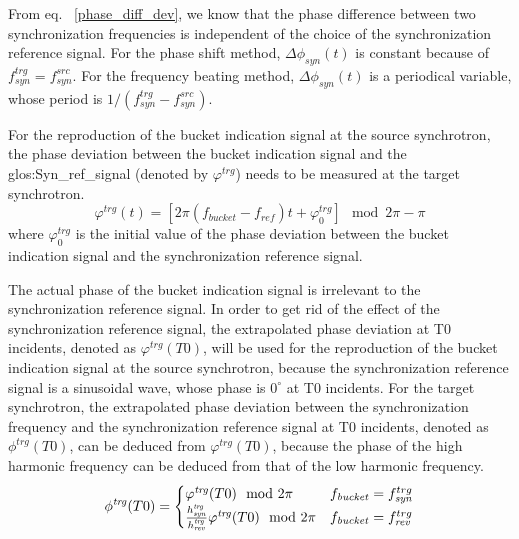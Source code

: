 From eq. ~\ref{phase_diff_dev}, we know that the phase difference between two synchronization frequencies is independent of the choice of the synchronization reference signal. For the phase shift method, $\Delta \phi_\mathit{syn}(t)$ is constant because of $f_\mathit{syn}^{trg}=f_\mathit{syn}^{src}$. For the frequency beating method, $\Delta \phi_\mathit{syn}(t)$ is a periodical variable, whose period is $1/(f_\mathit{syn}^{trg}-f_\mathit{syn}^{src})$. 

For the reproduction of the bucket indication signal at the source synchrotron, the phase deviation between the bucket indication signal and the \gls{glos:Syn_ref_signal} (denoted by $\varphi^\mathit{trg}$) needs to be measured at the target synchrotron.
\begin{equation}
\varphi^\mathit{trg}(t)= [2\pi(f_\mathit{bucket}-f_\mathit{ref})t+\varphi^\mathit{trg}_0] \mod 2\pi - \pi
\end{equation}
where $\varphi^\mathit{trg}_0$ is the initial value of the phase deviation between the bucket indication signal and the synchronization reference signal.

The actual phase of the bucket indication signal is irrelevant to the synchronization reference signal. In order to get rid of the effect of the synchronization reference signal, the extrapolated phase deviation at T0 incidents, denoted as $\varphi^\mathit{trg}({T0})$, will be used for the reproduction of the bucket indication signal at the source synchrotron, because the synchronization reference signal is a sinusoidal wave, whose phase is $0^\circ$ at T0 incidents. For the target synchrotron, the extrapolated phase deviation between the synchronization frequency and the synchronization reference signal at T0 incidents, denoted as $\phi^\mathit{trg}({T0})$, can be deduced from $\varphi^\mathit{trg}({T0})$, because the phase of the high harmonic frequency can be deduced from that of the low harmonic frequency.
\begin{eqnarray}
\phi^\mathit{trg}({T0})=
\begin{cases}
\varphi^\mathit{trg}({T0}) \mod 2\pi &f_{\mathit{bucket}}=f_{\mathit{syn}}^{trg}\cr

\frac{h_\mathit{syn}^\mathit{trg}}{h_\mathit{rev}^\mathit{trg}}\varphi^\mathit{trg}({T0}) \mod 2\pi &f_{\mathit{bucket}}=f_{\mathit{rev}}^{trg}
\label{relation}
\end{cases}
\end{eqnarray}

